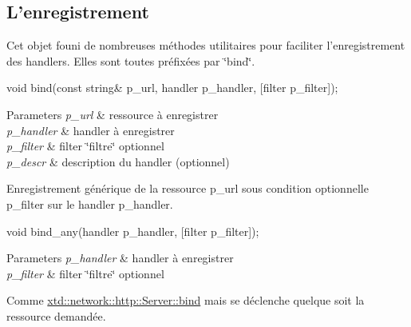\par
 \subsection*{L'enregistrement }

Cet objet founi de nombreuses méthodes utilitaires pour faciliter l'enregistrement des handlers. Elles sont toutes préfixées par \char`\"{}bind\char`\"{}.


\begin{DoxyItemize}
\item 
\begin{DoxyCode}
\textcolor{keywordtype}{void} bind(\textcolor{keyword}{const} \textcolor{keywordtype}{string}& p\_url, handler p\_handler, [filter p\_filter]); 
\end{DoxyCode}
 
\begin{DoxyParams}{Parameters}
{\em p\-\_\-url} & ressource à enregistrer \\
\hline
{\em p\-\_\-handler} & handler à enregistrer \\
\hline
{\em p\-\_\-filter} & filter \char`\"{}filtre\char`\"{} optionnel \\
\hline
{\em p\-\_\-descr} & description du handler (optionnel)\\
\hline
\end{DoxyParams}
Enregistrement générique de la ressource p\-\_\-url sous condition optionnelle p\-\_\-filter sur le handler p\-\_\-handler. \par
\par

\item 
\begin{DoxyCode}
\textcolor{keywordtype}{void} bind\_any(handler p\_handler, [filter p\_filter]); 
\end{DoxyCode}
 \par
\par
 
\begin{DoxyParams}{Parameters}
{\em p\-\_\-handler} & handler à enregistrer \\
\hline
{\em p\-\_\-filter} & filter \char`\"{}filtre\char`\"{} optionnel\\
\hline
\end{DoxyParams}
Comme \hyperlink{classxtd_1_1network_1_1http_1_1Server_a7281ae7cdda6d7b2334b27e530ce000f}{xtd\-::network\-::http\-::\-Server\-::bind} mais se déclenche quelque soit la ressource demandée. \par
\par


\end{DoxyItemize}
